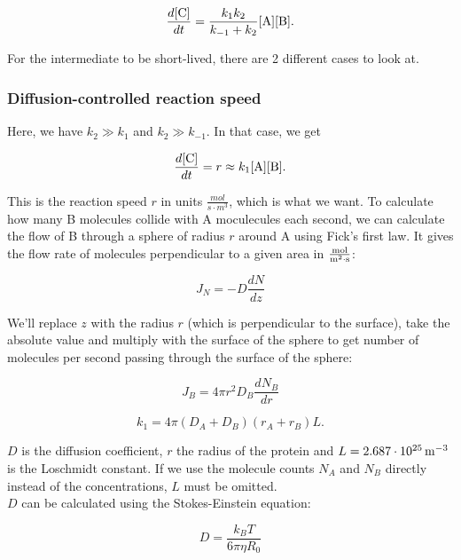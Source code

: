 \documentclass{article}
\begin{document}
	\begin{equation}
		\frac{d\ce{[C]}}{dt} = \frac{k_1k_2}{k_{-1}+k_2}\ce{[A][B]}.
	\end{equation}	
	
	For the intermediate to be short-lived, there are 2 different cases to look at.
	
	\subsubsection{Diffusion-controlled reaction speed}
	Here, we have $k_2 \gg k_1$ and $k_2 \gg k_{-1}$. In that case, we get
	
	\begin{equation}
		\frac{d\ce{[C]}}{dt} = r \approx k_1\ce{[A][B]}.
	\end{equation}
	
	This is the reaction speed $r$ in units $\frac{mol}{s\cdot m^3}$, which is what we want. To calculate how many B molecules collide with A moculecules each second, we can calculate the flow of B through a sphere of radius $r$ around A using Fick's first law. It gives the flow rate of molecules perpendicular to a given area in $\unit[]{\frac{mol}{m^2\cdot s}}$: 
	
	\begin{equation}
		J_N = -D\frac{dN}{dz}
	\end{equation}

	We'll replace $z$ with the radius $r$ (which is perpendicular to the surface), take the absolute value and multiply with the surface of the sphere to get number of molecules per second passing through the surface of the sphere:
	
	\begin{equation}
		J_B = 4\pi r^2D_B\frac{dN_B}{dr}
	\end{equation}

 
	
	\begin{equation}
		k_1 = 4\pi (D_A + D_B)(r_A + r_B)L. 
	\end{equation}

	$D$ is the diffusion coefficient, $r$ the radius of the protein and $L = \unit[2.687\cdot10^{25}]{m^{-3}}$ is the Loschmidt constant. If we use the molecule counts $N_A$ and $N_B$ directly instead of the concentrations, $L$ must be omitted.\\
	$D$ can be calculated using the Stokes-Einstein equation:
	
	\begin{equation}
		D = \frac{k_BT}{6\pi\eta R_0}
	\end{equation}
\end{document}
